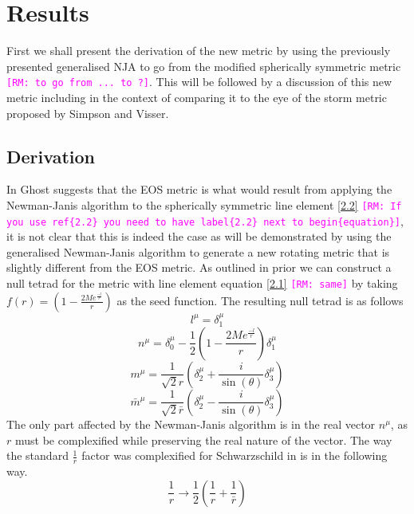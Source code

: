 \documentclass[12pt]{iopart}
\def\rmc#1{\textcolor{magenta}{\tt[RM: #1]}}
\begin{document}
\section{Results}
First we shall present the derivation of the new metric by using the previously presented generalised NJA to go from the modified spherically symmetric metric \rmc{to go from ... to ?}. This will be followed by a discussion of this new metric including in the context of comparing it to the eye of the storm metric proposed by Simpson and Visser.
\subsection{Derivation}
In \cite{Ghosh:2014pba} Ghost suggests that the EOS metric is what would result from applying the Newman-Janis algorithm to the spherically symmetric line element \ref{2.2} \rmc{If you use ref\{2.2\} you need to have label\{2.2\} next to begin\{equation\}}, it is not clear that this is indeed the case as will be demonstrated by using the generalised Newman-Janis algorithm to generate a new rotating metric that is slightly different from the EOS metric. As outlined in prior we can construct a null tetrad for the metric with line element equation \ref{2.1} \rmc{same} by taking $f(r)=\left(1-\frac{2Me^{\frac{-l}{r}}}{r}\right)$ as the seed function. The resulting null tetrad is as follows
 \begin{equation}
 l^{\mu}=\delta^{\mu}_1
 \end{equation}
 \begin{equation}
 n^{\mu}=\delta^{\mu}_0-\frac{1}{2}\left(1-\frac{2Me^{\frac{-l}{r}}}{r}\right)\delta^{\mu}_1
 \end{equation}
 \begin{equation}
 m^{\mu}=\frac{1}{\sqrt{2}r}\left(\delta^{\mu}_2+\frac{i}{\sin(\theta)}\delta^{\mu}_3\right)
 \end{equation}
 \begin{equation}
 \bar{m}^{\mu}=\frac{1}{\sqrt{2}\bar{r}}\left(\delta^{\mu}_2-\frac{i}{\sin(\theta)}\delta^{\mu}_3\right)
 \end{equation}
The only part affected by the Newman-Janis algorithm is in the real vector $n^{\mu}$, as $r$ must be complexified while preserving the real nature of the vector. The way the standard $\frac{1}{r}$ factor was complexified for Schwarzschild in \cite{Newman:1965tw, dInverno:1992gxs, Drake:1998gf} is in the following way.
 \begin{equation}
 \frac{1}{r} \rightarrow \frac{1}{2}\left(\frac{1}{r}+\frac{1}{\bar{r}}\right)
 \end{equation}
\end{document}
